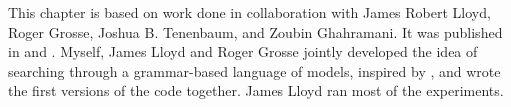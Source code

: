 
This chapter is based on work done in collaboration with James Robert Lloyd, Roger Grosse, Joshua B. Tenenbaum, and Zoubin Ghahramani.
It was published in \citet{DuvLloGroetal13} and \citet{LloDuvGroetal14}.
Myself, James Lloyd and Roger Grosse jointly developed the idea of searching through a grammar-based language of \gp{} models, inspired by \citet{grosse2012exploiting}, and wrote the first versions of the code together.
James Lloyd ran most of the experiments.




